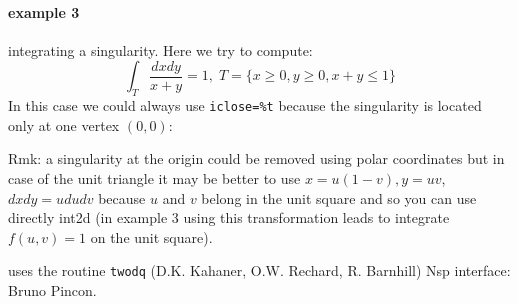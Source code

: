 \begin{examples}
\paragraph{example 3} integrating a singularity. Here we try to compute:
$$
    \int_T \frac{dxdy}{x+y} = 1, \; T = \{ x \ge 0, y \ge 0, x+y \le 1 \}
$$ 
In this case we could always use \verb+iclose=%t+ because the singularity is
located only at one vertex $(0,0)$:
\begin{program}
\end{program}
Rmk: a singularity at the origin could be removed using polar
coordinates but in case of the unit triangle it may be better
to use $x = u(1-v), y = uv$, $dxdy = u dudv$ because $u$ and $v$
belong in the unit square and so you can use directly int2d
(in example 3 using this transformation leads to integrate $f(u,v)=1$
on the unit square). 
\end{examples}

\begin{manseealso}
\end{manseealso}

\begin{authors}
  uses the routine \verb!twodq! (D.K. Kahaner, O.W. Rechard, R. Barnhill)
  Nsp interface: Bruno Pincon.
\end{authors}
